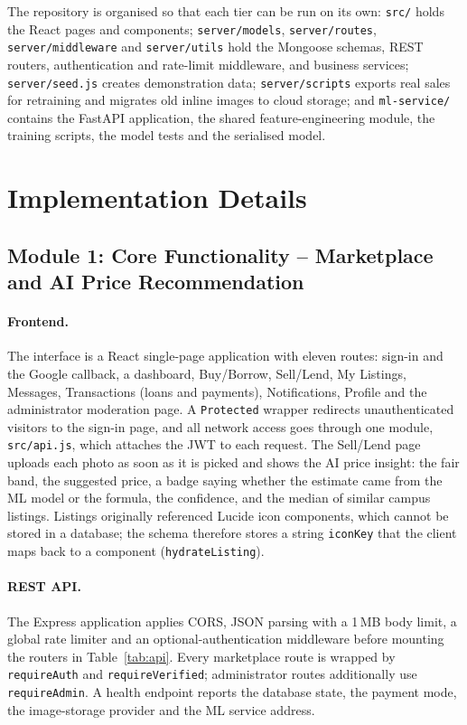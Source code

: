 \documentclass[12pt,letterpaper,twoside,openany]{report}
\newcommand{\code}[1]{\texttt{#1}}
\begin{document}
The repository is organised so that each tier can be run on its own: \code{src/} holds the React pages
and components; \code{server/models}, \code{server/routes}, \code{server/middleware} and \code{server/utils}
hold the Mongoose schemas, REST routers, authentication and rate-limit middleware, and business services;
\code{server/seed.js} creates demonstration data; \code{server/scripts} exports real sales for retraining and
migrates old inline images to cloud storage; and \code{ml-service/} contains the FastAPI application, the
shared feature-engineering module, the training scripts, the model tests and the serialised model.

\section{Implementation Details}

\subsection{Module 1: Core Functionality -- Marketplace and AI Price Recommendation}
\paragraph{Frontend.} The interface is a React single-page application with eleven routes: sign-in and the
Google callback, a dashboard, Buy/Borrow, Sell/Lend, My Listings, Messages, Transactions (loans and
payments), Notifications, Profile and the administrator moderation page. A \code{Protected} wrapper
redirects unauthenticated visitors to the sign-in page, and all network access goes through one module,
\code{src/api.js}, which attaches the JWT to each request. The Sell/Lend page uploads each photo as soon as
it is picked and shows the AI price insight: the fair band, the suggested price, a badge saying whether the
estimate came from the ML model or the formula, the confidence, and the median of similar campus listings.
Listings originally referenced Lucide icon components, which cannot be stored in a database; the schema
therefore stores a string \code{iconKey} that the client maps back to a component (\code{hydrateListing}).

\paragraph{REST API.} The Express application applies CORS, JSON parsing with a 1\,MB body limit, a global
rate limiter and an optional-authentication middleware before mounting the routers in Table~\ref{tab:api}.
Every marketplace route is wrapped by \code{requireAuth} and \code{requireVerified}; administrator routes
additionally use \code{requireAdmin}. A health endpoint reports the database state, the payment mode, the
image-storage provider and the ML service address.
\end{document}
